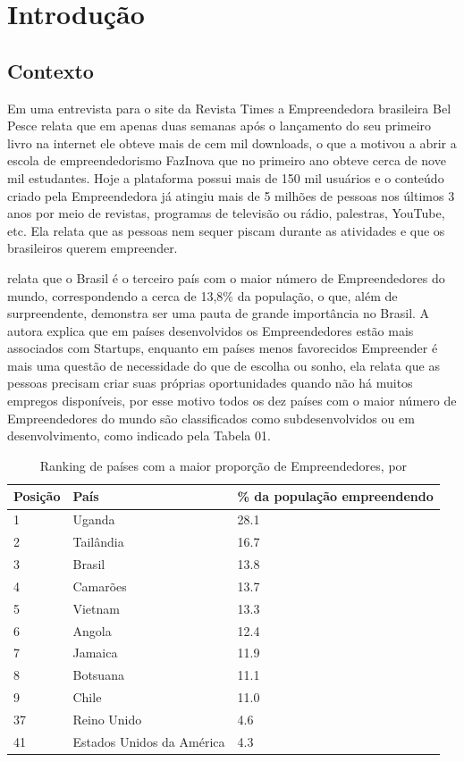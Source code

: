 \chapter{Introdução}
\label{cap-introducao}

\section{Contexto}
\label{section:contexto}

Em uma entrevista para o site da Revista Times a Empreendedora brasileira Bel Pesce relata que em apenas duas semanas após o lançamento do seu primeiro livro na internet ele obteve mais de cem mil downloads, o que a motivou a abrir a escola de empreendedorismo FazInova que no primeiro ano obteve cerca de nove mil estudantes. Hoje a plataforma possui mais de 150 mil usuários e o conteúdo criado pela Empreendedora já atingiu mais de 5 milhões de pessoas nos últimos 3 anos por meio de revistas, programas de televisão ou rádio, palestras, YouTube, etc. Ela relata que as pessoas nem sequer piscam durante as atividades e que os brasileiros querem empreender.

 relata que o Brasil é o terceiro país com o maior número de Empreendedores do mundo, correspondendo a cerca de 13,8\% da população, o que, além de surpreendente, demonstra ser uma pauta de grande importância no Brasil. A autora explica que em países desenvolvidos os Empreendedores estão mais associados com Startups, enquanto em países menos favorecidos Empreender é mais uma questão de necessidade do que de escolha ou sonho, ela relata que as pessoas precisam criar suas próprias oportunidades quando não há muitos empregos disponíveis, por esse motivo todos os dez países com o maior número de Empreendedores do mundo são classificados como subdesenvolvidos ou em desenvolvimento, como indicado pela Tabela 01.

\begin{table}[!htb]
	\centering
	\label{tabela:ranking_de_paises_com_mais_empreendedores}
	\begin{tabular}{ | p{3cm} | p{8cm} | p{4cm} | }
		\hline
		Posição & País & \% da população empreendendo \\ \hline
		1 & Uganda & 28.1 \\ \hline
		2 & Tailândia & 16.7 \\ \hline
		3 & Brasil & 13.8 \\ \hline
		4 & Camarões & 13.7 \\ \hline
		5 & Vietnam & 13.3 \\ \hline
		6 & Angola & 12.4 \\ \hline
		7 & Jamaica & 11.9 \\ \hline
		8 & Botsuana & 11.1 \\ \hline
		9 & Chile & 11.0 \\ \hline
		37 & Reino Unido & 4.6 \\ \hline
		41 & Estados Unidos da América & 4.3 \\ \hline
	\end{tabular}
	\caption{Ranking de países com a maior proporção de Empreendedores, por \cite{Brinded2015}}
\end{table}

